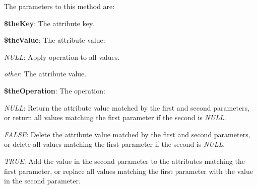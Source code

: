 The parameters to this method are\-:


\begin{DoxyItemize}
\item {\bfseries \$the\-Key}\-: The attribute key. 
\item {\bfseries \$the\-Value}\-: The attribute value\-: 
\begin{DoxyItemize}
\item {\itshape N\-U\-L\-L}\-: Apply operation to all values. 
\item {\itshape other}\-: The attribute value. 
\end{DoxyItemize}
\item {\bfseries \$the\-Operation}\-: The operation\-: 
\begin{DoxyItemize}
\item {\itshape N\-U\-L\-L}\-: Return the attribute value matched by the first and second parameters, or return all values matching the first parameter if the second is {\itshape N\-U\-L\-L}. 
\item {\itshape F\-A\-L\-S\-E}\-: Delete the attribute value matched by the first and second parameters, or delete all values matching the first parameter if the second is {\itshape N\-U\-L\-L}. 
\item {\itshape T\-R\-U\-E}\-: Add the value in the second parameter to the attributes matching the first parameter, or replace all values matching the first parameter with the value in the second parameter. 
\end{DoxyItemize}
\end{DoxyItemize}


